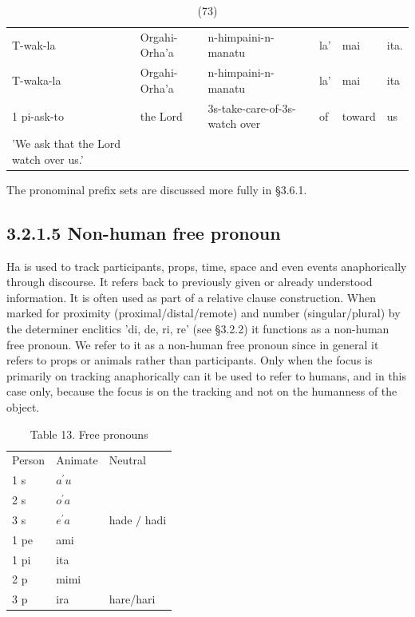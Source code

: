 \documentclass[10pt]{article}
\begin{document}
\begin{table}[h]
\begin{center}
\captionsetup{labelformat=empty}
\caption{(73)}
\begin{tabular}{llllll}
T-wak-la & Orgahi-Orha'a & n-himpaini-n-manatu & la' & mai & ita. \\
T-waka-la & Orgahi-Orha'a & n-himpaini-n-manatu & la' & mai & ita \\
1 pi-ask-to & the Lord & 3s-take-care-of-3s-watch over & of & toward & us \\
'We ask that the Lord watch over us.' &  &  &  &  &  \\
\end{tabular}
\end{center}
\end{table}

The pronominal prefix sets are discussed more fully in §3.6.1.

\subsection*{3.2.1.5 Non-human free pronoun}
Ha is used to track participants, props, time, space and even events anaphorically through discourse. It refers back to previously given or already understood information. It is often used as part of a relative clause construction. When marked for proximity (proximal/distal/remote) and number (singular/plural) by the determiner enclitics 'di, de, ri, re' (see §3.2.2) it functions as a non-human free pronoun. We refer to it as a non-human free pronoun since in general it refers to props or animals rather than participants. Only when the focus is primarily on tracking anaphorically can it be used to refer to humans, and in this case only, because the focus is on the tracking and not on the humanness of the object.

\begin{table}[h]
\begin{center}
\captionsetup{labelformat=empty}
\caption{Table 13. Free pronouns}
\begin{tabular}{|lll|}
\hline
Person & Animate & Neutral \\
1 s & \(a^{\prime} u\) &  \\
2 s & \(o^{\prime} a\) &  \\
3 s & \(e^{\prime} a\) & hade \(/\) hadi \\
1 pe & ami &  \\
1 pi & ita &  \\
2 p & mimi &  \\
3 p & ira & hare/hari \\
\hline
\end{tabular}
\end{center}
\end{table}
\end{document}

